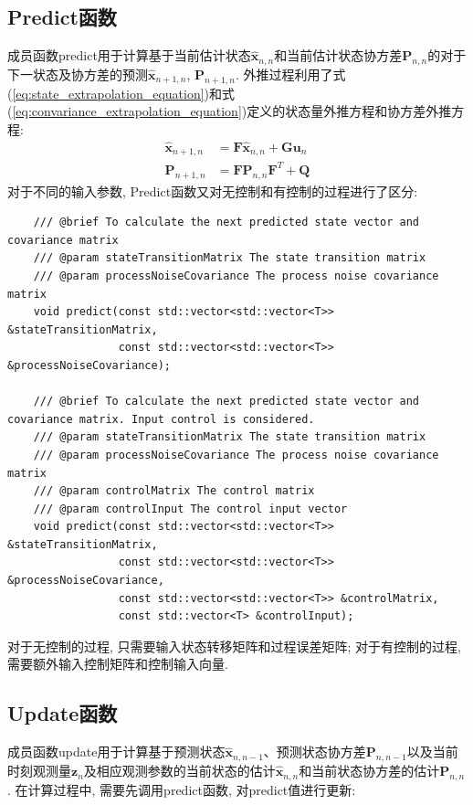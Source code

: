 \documentclass[12pt]{article}
\begin{document}
\subsection{Predict函数}

成员函数predict用于计算基于当前估计状态$\hat{\bm{x}}_{n,n}$和当前估计状态协方差$\bm{P}_{n,n}$的对于下一状态及协方差的预测$\hat{\bm{x}}_{n+1,n}$, $\bm{P}_{n+1,n}$. 外推过程利用了式(\ref{eq:state_extrapolation_equation})和式(\ref{eq:convariance_extrapolation_equation})定义的状态量外推方程和协方差外推方程:
\begin{equation*}
\begin{aligned}
\hat{\bm{x}}_{n+1,n} &= \bm{F} \hat{\bm{x}}_{n,n} + \bm{G} \bm{u}_n \\
\bm{P}_{n+1,n} &= \bm{F}\bm{P}_{n,n}\bm{F}^T + \bm{Q}
\end{aligned}
\end{equation*}
对于不同的输入参数, Predict函数又对无控制和有控制的过程进行了区分:
\begin{lstlisting}
    /// @brief To calculate the next predicted state vector and covariance matrix
    /// @param stateTransitionMatrix The state transition matrix
    /// @param processNoiseCovariance The process noise covariance matrix
    void predict(const std::vector<std::vector<T>> &stateTransitionMatrix,
                 const std::vector<std::vector<T>> &processNoiseCovariance);
    
    /// @brief To calculate the next predicted state vector and covariance matrix. Input control is considered.
    /// @param stateTransitionMatrix The state transition matrix
    /// @param processNoiseCovariance The process noise covariance matrix
    /// @param controlMatrix The control matrix
    /// @param controlInput The control input vector
    void predict(const std::vector<std::vector<T>> &stateTransitionMatrix,
                 const std::vector<std::vector<T>> &processNoiseCovariance,
                 const std::vector<std::vector<T>> &controlMatrix,
                 const std::vector<T> &controlInput);
\end{lstlisting}
对于无控制的过程, 只需要输入状态转移矩阵和过程误差矩阵; 对于有控制的过程, 需要额外输入控制矩阵和控制输入向量. 

\subsection{Update函数}

成员函数update用于计算基于预测状态$\hat{\bm{x}}_{n,n-1}$、预测状态协方差$\bm{P}_{n,n-1}$以及当前时刻观测量$\bm{z}_n$及相应观测参数的当前状态的估计$\hat{\bm{x}}_{n,n}$和当前状态协方差的估计$\bm{P}_{n,n}$. 在计算过程中, 需要先调用predict函数, 对predict值进行更新:
\end{document}
